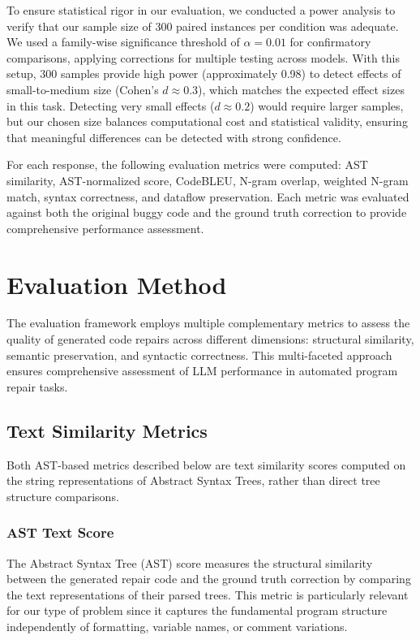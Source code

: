 
To ensure statistical rigor in our evaluation, we conducted a power analysis to verify that our sample size of 300 paired instances per condition was adequate. We used a family-wise significance threshold of $\alpha = 0.01$ for confirmatory comparisons, applying corrections for multiple testing across models. With this setup, 300 samples provide high power (approximately 0.98) to detect effects of small-to-medium size (Cohen's $d \approx 0.3$), which matches the expected effect sizes in this task. Detecting very small effects ($d \approx 0.2$) would require larger samples, but our chosen size balances computational cost and statistical validity, ensuring that meaningful differences can be detected with strong confidence.

For each response, the following evaluation metrics were computed: AST similarity, AST-normalized score, CodeBLEU, N-gram overlap, weighted N-gram match, syntax correctness, and dataflow preservation. Each metric was evaluated against both the original buggy code and the ground truth correction to provide comprehensive performance assessment.

\section{Evaluation Method}
\label{sec:evaluation-method}

The evaluation framework employs multiple complementary metrics to assess the quality of generated code repairs across different dimensions: structural similarity, semantic preservation, and syntactic correctness. This multi-faceted approach ensures comprehensive assessment of LLM performance in automated program repair tasks.

\subsection{Text Similarity Metrics}

Both AST-based metrics described below are text similarity scores computed on the string representations of Abstract Syntax Trees, rather than direct tree structure comparisons.

\subsubsection{AST Text Score}
The Abstract Syntax Tree (AST) \cite{4299919} score measures the structural similarity between the generated repair code and the ground truth correction by comparing the text representations of their parsed trees. This metric is particularly relevant for our type of problem since it captures the fundamental program structure independently of formatting, variable names, or comment variations.


